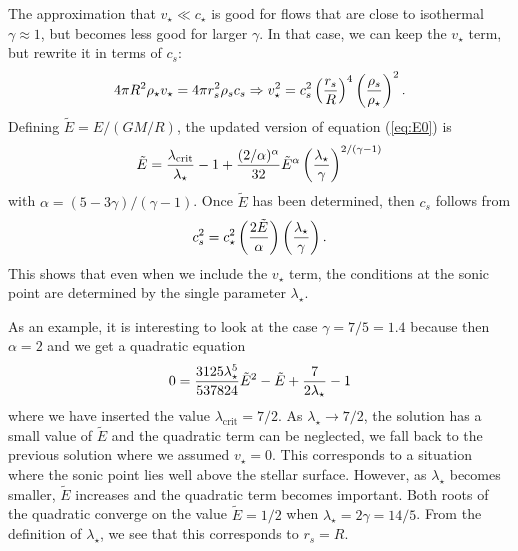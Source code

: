 \documentclass[preprint,12pt]{aastex}
\begin{document}
The approximation that $v_\star\ll c_\star$ is good for flows that are close to isothermal $\gamma\approx 1$, but becomes less good for larger $\gamma$. In that case, we can keep the $v_\star$ term, but rewrite it in terms of $c_s$:
\begin{equation}
4\pi R^2\rho_\star v_\star = 4\pi r_s^2 \rho_s c_s\Rightarrow v_\star^2 = c_s^2 \left({r_s\over R}\right)^4\left({\rho_s\over \rho_\star}\right)^2.
\end{equation}
Defining $\tilde{E} = E/ (GM/R)$, the updated version of equation (\ref{eq:E0}) is
\begin{equation}\label{eq:tildeEeqn}
\tilde{E} = {\lambda_\mathrm{crit}\over \lambda_\star}-1 + {(2/\alpha)^\alpha\over 32}\tilde{E}^\alpha \left({\lambda_\star\over \gamma}\right)^{2/(\gamma-1)}
\end{equation}
with $\alpha = (5-3\gamma)/(\gamma-1)$. Once $\tilde{E}$ has been determined, then $c_s$ follows from
\begin{equation}\label{eq:cseqn}
c_s^2 = c_\star^2 \left({2\tilde{E}\over \alpha}\right)\left({\lambda_\star\over\gamma}\right).
\end{equation}
This shows that even when we include the $v_\star$ term, the conditions at the sonic point are determined by the single parameter $\lambda_\star$. 

As an example, it is interesting to look at the case $\gamma=7/5=1.4$ because then $\alpha=2$ and we get a quadratic equation
\begin{equation}
0 = {3125\lambda_\star^5\over 537824}\tilde{E}^2 -\tilde{E} + {7\over 2\lambda_\star}-1
\end{equation}
where we have inserted the value $\lambda_\mathrm{crit}=7/2$. As $\lambda_\star\rightarrow 7/2$, the solution has a small value of $\tilde{E}$ and the quadratic term can be neglected, we fall back to the previous solution where we assumed $v_\star=0$. This corresponds to a situation where the sonic point lies well above the stellar surface. However, as $\lambda_\star$ becomes smaller, $\tilde{E}$ increases and the quadratic term becomes important. Both roots of the quadratic converge on the value $\tilde{E}=1/2$ when $\lambda_\star = 2\gamma = 14/5$. From the definition of $\lambda_\star$, we see that this corresponds to $r_s=R$. 
\end{document}
